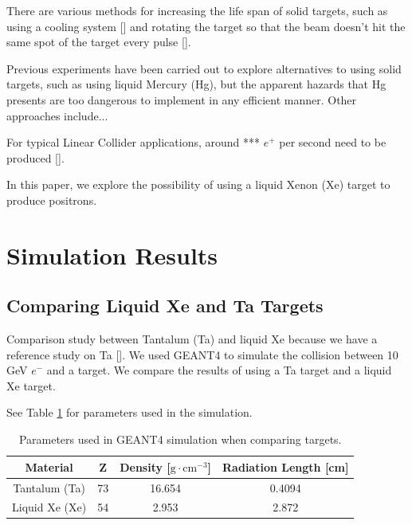 \documentclass[%
reprint,
amsmath, amssymb,
aps,
floatfix,
]{revtex4-2}
\begin{document}
There are various methods for increasing
the life span of solid targets, such as using a cooling system [] and rotating the target so that the beam doesn't
hit the same spot of the target every pulse [].

Previous experiments have been carried out to explore alternatives to using solid targets, such as using liquid Mercury (Hg),
but the apparent hazards that Hg presents are too dangerous to implement in any efficient manner.
Other approaches include...

For typical Linear Collider applications, around *** $e^+$ per second need to be produced [].

In this paper, we explore the possibility of using a liquid Xenon (Xe) target to produce positrons.

\section{Simulation Results}
\subsection{Comparing Liquid Xe and Ta Targets}
Comparison study between Tantalum (Ta) and liquid Xe because we have a reference study on Ta [].
We used GEANT4 to simulate the collision between 10 GeV $e^-$ and a target.  We compare the results of using a
Ta target and a liquid Xe target.

See Table \ref{tab:G4Params} for parameters used in the simulation.
\begin{table}[h]
    \centering
    \begin{tabular}{cccc}
        \hline \hline
        Material & Z & Density [$\textrm{g} \cdot \textrm{cm}^{-3} $] & Radiation Length [cm] \\
        \hline
        Tantalum (Ta) & 73 & 16.654 & 0.4094 \\
        Liquid Xe (Xe) & 54 & 2.953 & 2.872 \\
        \hline \hline
    \end{tabular}
    \caption{\label{tab:G4Params}Parameters used in GEANT4 simulation when comparing targets.}
\end{table}
\end{document}
